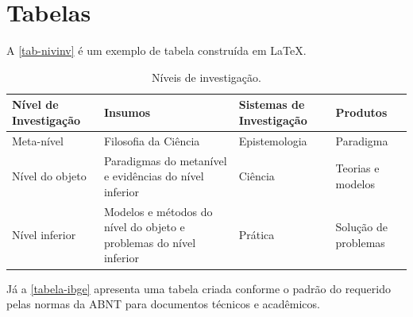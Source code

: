 \section{Tabelas}
A \autoref{tab-nivinv} é um exemplo de tabela construída em
\LaTeX.

\begin{table}[htb]
	\ABNTEXfontereduzida
	\caption[Níveis de investigação]{Níveis de investigação.}
	\label{tab-nivinv}
	\begin{tabular}{p{2.6cm} p{6.0cm} p{2.25cm} p{3.40cm}}
		\toprule
		\textbf{Nível de Investigação} & \textbf{Insumos}  & \textbf{Sistemas de Investigação}  & \textbf{Produtos}  \\
		\midrule
		Meta-nível & Filosofia\index{filosofia} da Ciência  & Epistemologia &
		Paradigma  \\
		
		Nível do objeto & Paradigmas do metanível e evidências do nível inferior &
		Ciência  & Teorias e modelos \\
		
		Nível inferior & Modelos e métodos do nível do objeto e problemas do nível inferior & Prática & Solução de problemas  \\
		\bottomrule
	\end{tabular}
	\ABNTEXfontereduzida{}
\end{table}

Já a \autoref{tabela-ibge} apresenta uma tabela criada conforme o padrão do
\textcite{ibge1993} requerido pelas normas da ABNT para documentos técnicos e
acadêmicos.

\begin{table}[htb]

\end{table}

